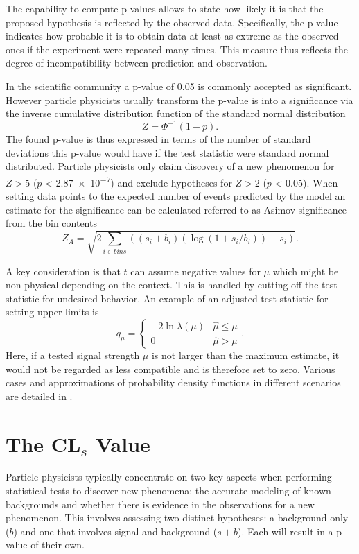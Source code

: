 The capability to compute p-values allows to state how likely it is that the proposed hypothesis is reflected by the observed data. Specifically, the p-value indicates how probable it is to obtain data at least as extreme as the observed ones if the experiment were repeated many times. This measure thus reflects the degree of incompatibility between prediction and observation.

In the scientific community a p-value of 0.05 is commonly accepted as significant. However particle physicists usually transform the p-value is into a significance via the inverse cumulative distribution function of the standard normal distribution
\begin{equation}
    Z = \Phi^{-1}(1 - p).
\end{equation}
The found p-value is thus expressed in terms of the number of standard deviations this p-value would have if the test statistic were standard normal distributed. Particle physicists only claim discovery of a new phenomenon for $Z>5$ ($p$ < \qty{2.87e-7}{}) and exclude hypotheses for $Z>2$ ($p$ < 0.05). When setting data points to the expected number of events predicted by the model an estimate for the significance can be calculated referred to as Asimov significance from the bin contents
\begin{equation}\label{eq:asimov-significance}
    Z_A = \sqrt{2\sum_{i\in bins}((s_i + b_i)(\log{(1 + s_i / b_i)}) - s_i)}.
\end{equation}


A key consideration is that $t$ can assume negative values for $\mu$ which might be non-physical depending on the context. This is handled by cutting off the test statistic for undesired behavior. An example of an adjusted test statistic for setting upper limits is
\begin{equation}
    q_\mu=
    \begin{cases}
        -2\ln \lambda(\mu) & \hat{\mu}\leq\mu \\
        0                  & \hat{\mu}> \mu
    \end{cases}.
\end{equation}
Here, if a tested signal strength $\mu$ is not larger than the maximum estimate, it would not be regarded as less compatible and is therefore set to zero. Various cases and approximations of probability density functions in different scenarios are detailed in \citep{cowan2011asymptotic}.

\section{The CL$_s$ Value}\label{sec:cls}
Particle physicists typically concentrate on two key aspects when performing statistical tests to discover new phenomena: the accurate modeling of known backgrounds and whether there is evidence in the observations for a new phenomenon. This involves assessing two distinct hypotheses: a background only ($b$) and one that involves signal and background ($s+b$). Each will result in a p-value of their own.

